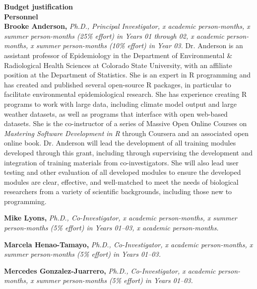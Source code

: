 \documentclass[pdftex,english,11pt,parskip=half]{scrartcl}
\begin{document}
\def\bf{\normalfont\bfseries}
\pagestyle{empty}

\textbf{Budget justification} \ \\

{\large \textbf{Personnel}} \\

\noindent \textbf{Brooke Anderson,} \textit{Ph.D., Principal Investigator, x academic person-months, x summer person-months (25\% effort) in Years 01 through 02, x academic person-months, x summer person-months (10\% effort) in Year 03.} Dr. Anderson is an assistant professor of Epidemiology in the Department of Environmental \& Radiological Health Sciences at Colorado State University, with an affiliate position at the Department of Statistics. She is an expert in R programming and has created and published several open-source R packages, in particular to facilitate environmental epidemiological research. She has experience creating R programs to work with large data, including climate model output and large weather datasets, as well as programs that interface with open web-based datasets. She is the co-instructor of a series of Massive Open Online Courses on \textit{Mastering Software Development in R} through Coursera and an associated open online book. Dr. Anderson will lead the development of all training modules developed through this grant, including through supervising the development and integration of training materials from co-investigators. She will also lead user testing and other evaluation of all developed modules to ensure the developed modules are clear, effective, and well-matched to meet the needs of biological researchers from a variety of scientific backgrounds, including those new to programming. 

\noindent \textbf{Mike Lyons,} \textit{Ph.D., Co-Investigator, x academic person-months, x summer person-months (5\% effort) in Years 01--03, x academic person-months.}

\noindent \textbf{Marcela Henao-Tamayo,} \textit{Ph.D., Co-Investigator, x academic person-months, x summer person-months (5\% effort) in Years 01--03.}

\noindent \textbf{Mercedes Gonzalez-Juarrero,} \textit{Ph.D., Co-Investigator, x academic person-months, x summer person-months (5\% effort) in Years 01--03.}
\end{document}
